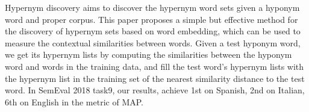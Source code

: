 Hypernym discovery aims to discover the hypernym word sets given a hyponym word and proper corpus. This paper proposes a simple but effective method for the discovery of hypernym sets based on word embedding, which can be used to measure the contextual similarities between words. Given a test hyponym  word, we get its hypernym lists by computing the similarities between the hyponym word and words in the training data, and fill the test word's  hypernym lists with the hypernym list in the training set of the nearest similarity distance to the test word. In SemEval 2018 task9, our results, achieve 1st on Spanish, 2nd on Italian, 6th on English in the metric of MAP.

